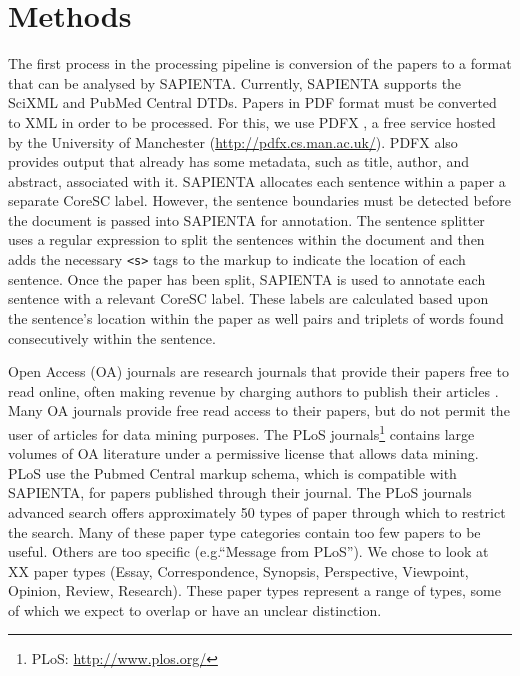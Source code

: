 \documentclass{svmult}
\begin{document}


\section{Methods}
\label{sec:2}


The first process in the processing pipeline is conversion of the papers to a format that can be analysed by SAPIENTA.
Currently, SAPIENTA supports the SciXML and PubMed Central DTDs. 
Papers in PDF format must be converted to XML in order to be processed. 
For this, we use PDFX \cite{PDFX}, a free service hosted by the University of Manchester (\url{http://pdfx.cs.man.ac.uk/}). 
PDFX also provides output that already has some metadata, such as title, author, and abstract, associated with it.
SAPIENTA allocates each sentence within a paper a separate CoreSC label. 
However, the sentence boundaries must be detected before the document is passed into SAPIENTA for annotation. 
The sentence splitter uses a regular expression to split the sentences within the document and then adds the necessary \verb|<s>| tags to the markup to indicate the location of each sentence.
Once the paper has been split, SAPIENTA is used to annotate each sentence with a relevant CoreSC label. 
These labels are calculated based upon the sentence's location within the paper as well pairs and triplets of words found consecutively within the sentence. 


Open Access (OA) journals are research journals that provide their papers free to read online, often making revenue by charging authors to publish their articles \cite{solomon2012study}. 
Many OA journals provide free read access to their papers, but do not permit the user of articles for data mining purposes.
The PLoS journals\footnote{PLoS: \url{http://www.plos.org/}} contains large volumes of OA literature under a permissive license that allows data mining. 
PLoS use the Pubmed Central markup schema, which is compatible with SAPIENTA, for papers published through their journal.
The PLoS journals advanced search offers approximately 50 types of paper through which to restrict the search. Many of these paper type categories contain too few papers to be useful. Others are too specific (e.g.``Message from PLoS''). We chose to look at XX paper types (Essay, Correspondence, Synopsis, Perspective, Viewpoint, Opinion, Review, Research). These paper types represent a range of types, some of which we expect to overlap or have an unclear distinction. 
\end{document}
